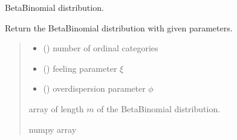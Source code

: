 \documentclass[letterpaper,10pt,english]{sphinxmanual}
\begin{document}

\begin{fulllineitems}
\label{\detokenize{cubmods:cubmods.cube.betar}}
\pysigstartsignatures
{}
\pysigstopsignatures
\sphinxAtStartPar
Beta\sphinxhyphen{}Binomial distribution.

\sphinxAtStartPar
Return the Beta\sphinxhyphen{}Binomial distribution with given parameters.
\begin{quote}\begin{description}
\begin{itemize}
\item {} 
\sphinxAtStartPar
{} () \textendash{} number of ordinal categories

\item {} 
\sphinxAtStartPar
{} () \textendash{} feeling parameter \(\xi\)

\item {} 
\sphinxAtStartPar
{} () \textendash{} overdispersion parameter \(\phi\)

\end{itemize}

\sphinxAtStartPar
array of length \(m\) of the Beta\sphinxhyphen{}Binomial distribution.

\sphinxAtStartPar
numpy array

\end{description}\end{quote}

\end{fulllineitems}

\end{document}

